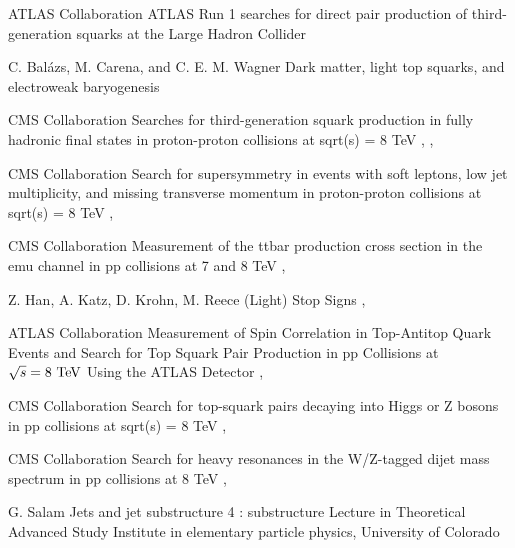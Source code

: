 {ATLAS Collaboration}
{ATLAS Run 1 searches for direct pair production of third-generation squarks at the Large Hadron Collider}
{}

{C. Balázs, M. Carena, and C. E. M. Wagner}
{Dark matter, light top squarks, and electroweak baryogenesis}
{}

{CMS Collaboration}
{Searches for third-generation squark production in fully hadronic final states in proton-proton collisions at sqrt(s) = 8 TeV}
{, , }

{CMS Collaboration}
{Search for supersymmetry in events with soft leptons, low jet multiplicity, and missing transverse momentum in proton-proton collisions at sqrt(s) = 8 TeV}
{, }

{CMS Collaboration}
{Measurement of the ttbar production cross section in the emu channel in pp collisions at 7 and 8 TeV}
{, }

{Z. Han, A. Katz, D. Krohn, M. Reece}
{(Light) Stop Signs}
{, }

{ATLAS Collaboration}
{Measurement of Spin Correlation in Top-Antitop Quark Events and Search for Top Squark Pair Production in pp Collisions at $\sqrt{s}=8~\text{TeV}$ Using the ATLAS Detector}
{, }

{CMS Collaboration}
{Search for top-squark pairs decaying into Higgs or Z bosons in pp collisions at sqrt(s) = 8 TeV}
{, }


{CMS Collaboration}
{Search for heavy resonances in the W/Z-tagged dijet mass
spectrum in pp collisions at 8 TeV}
{, }

{G. Salam}
{Jets and jet substructure 4 : substructure}
{Lecture in Theoretical Advanced Study Institute in elementary particle physics,
University of Colorado}

